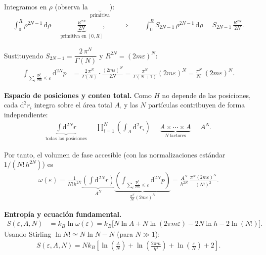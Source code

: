 \documentclass{article}
\begin{document}
Integramos en \(\rho\) (observa la \(\underbrace{~}_{\text{primitiva}}\)):
\begin{equation*}
\begin{split}
\int_{0}^{R} \rho^{2N-1}\,\mathrm d\rho
=\underbrace{\frac{R^{2N}}{2N}}_{\text{primitiva en }[0,R]},
\qquad\Rightarrow\qquad
\int_{0}^{R} S_{2N-1}\,\rho^{2N-1}\,\mathrm d\rho
= S_{2N-1}\,\frac{R^{2N}}{2N}.
\end{split}
\end{equation*}

Sustituyendo \(S_{2N-1}=\dfrac{2\,\pi^{N}}{\Gamma(N)}\) y \(R^{2N}=(2m\varepsilon)^{N}\):
\begin{equation*}
\begin{split}
\int_{\sum_{i}\frac{\mathbf p_i^{2}}{2m}\le \varepsilon}\!\!\mathrm d^{2N}p
&=\frac{2\,\pi^{N}}{\Gamma(N)}\cdot \frac{(2m\varepsilon)^{N}}{2N}
=\frac{\pi^{N}}{\Gamma(N+1)}(2m\varepsilon)^{N}
=\frac{\pi^{N}}{N!}\,(2m\varepsilon)^{N}.
\end{split}
\end{equation*}

\medskip
\textbf{Espacio de posiciones y conteo total.}
Como \(H\) no depende de las posiciones, cada \(\mathrm d^{2}r_i\) integra sobre el área total \(A\), y las \(N\) partículas contribuyen de forma independiente:
\begin{equation*}
\begin{split}
\underbrace{\int \mathrm d^{2N}r}_{\text{todas las posiciones}}
=\prod_{i=1}^{N}\left(\int_{A}\mathrm d^{2}r_i\right)
=\underbrace{A\times \cdots \times A}_{N\ \text{factores}}
=A^{N}.
\end{split}
\end{equation*}

Por tanto, el volumen de fase accesible (con las normalizaciones estándar \(1/(N!\,h^{2N})\)) es
\begin{equation*}
\begin{split}
\omega(\varepsilon)
=\frac{1}{N!\,h^{2N}}
\underbrace{\left(\int \mathrm d^{2N}r\right)}_{\displaystyle A^{N}}
\underbrace{\left(\int_{\sum_{i}\frac{\mathbf p_i^{2}}{2m}\le \varepsilon}\!\!\mathrm d^{2N}p\right)}_{\displaystyle \frac{\pi^{N}}{N!}(2m\varepsilon)^{N}}
=\frac{A^{N}}{h^{2N}}\,
\frac{\pi^{N}(2m\varepsilon)^{N}}{(N!)^{2}}.
\end{split}
\end{equation*}

\medskip
\textbf{Entropía y ecuación fundamental.}
\begin{equation*}
\begin{split}
S(\varepsilon,A,N)
&=k_B\ln \omega(\varepsilon)
= k_B\Big[
N\ln A+N\ln(2\pi m\varepsilon)-2N\ln h-2\ln(N!)
\Big].
\end{split}
\end{equation*}
Usando Stirling \(\ln N!\simeq N\ln N-N\) (para \(N\gg 1\)):
\begin{equation*}
\begin{split}
S(\varepsilon,A,N)
= N k_B\!\left[
\ln\!\left(\frac{A}{N}\right)
+\ln\!\left(\frac{2\pi m}{h^{2}}\right)
+\ln\!\left(\frac{\varepsilon}{N}\right)
+2
\right].
\end{split}
\end{equation*}
\end{document}
